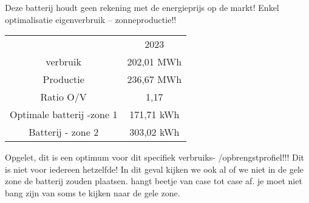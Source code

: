 \documentclass[12pt]{article}
\begin{document}
Deze batterij houdt geen rekening met de energieprijs op de
markt! Enkel optimalisatie eigenverbruik – zonneproductie!!
\begin{center}
    \begin{tabular}{|c|c|}
        & 2023\\
    verbruik & 202,01 MWh\\
    Productie & 236,67 MWh\\
    Ratio O/V & 1,17\\
    Optimale batterij -zone 1 & 171,71 kWh\\
    Batterij - zone 2 & 303,02 kWh
    \end{tabular}
\end{center}
Opgelet, dit is een optimum voor dit specifiek verbruiks-
/opbrengstprofiel!!! Dit is niet voor iedereen hetzelfde!
In dit geval kijken we ook al of we niet in de gele zone de batterij zouden plaatsen. hangt beetje van case tot case af. je moet niet bang zijn van soms te kijken naar de gele zone.
\end{document}
